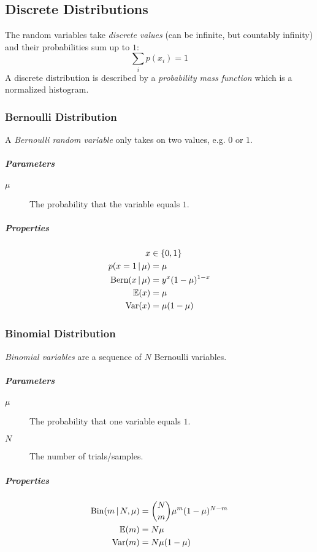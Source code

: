 \subsection{Discrete Distributions}
The random variables take \emph{discrete values} (can be infinite, but countably infinity) and their probabilities sum up to \(1\):
\begin{equation}
	\sum_i p(x_i) = 1
\end{equation}
A discrete distribution is described by a \emph{probability mass function} which is a normalized histogram.

\subsubsection{Bernoulli Distribution}
A \emph{Bernoulli random variable} only takes on two values, e.g. \(0\) or \(1\).

\subparagraph{Parameters}
\begin{description}
	\item[\(\mu\)] The probability that the variable equals \(1\).
\end{description}

\subparagraph{Properties}
	\begin{align}
		x                           & \in \{ 0, 1 \}        \\
		p(x = 1 \,\vert\, \mu)         & = \mu                 \\
		\textrm{Bern}(x \,\vert\, \mu) & = y^x (1 - \mu)^{1-x} \\
		\mathbb{E}(x)                       & = \mu                 \\
		\operatorname{Var}(x)                     & = \mu(1 - \mu)
	\end{align}

\subsubsection{Binomial Distribution}
\emph{Binomial variables} are a sequence of \(N\) Bernoulli variables.

\subparagraph{Parameters}
\begin{description}
	\item [\(\mu\)] The probability that one variable equals \(1\).
	\item [\(N\)] The number of trials/samples.
\end{description}

\subparagraph{Properties}
	\begin{align}
		\textrm{Bin}(m \,\vert\, N, \mu) & = { N \choose m } \mu^m (1 - \mu)^{N - m} \\
		\mathbb{E}(m)                         & = N\mu                                    \\
		\operatorname{Var}(m)                       & = N \mu (1 - \mu)
	\end{align}

